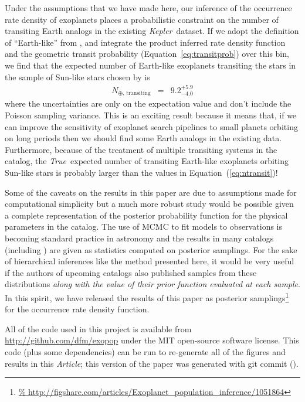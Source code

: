 \documentclass[12pt,preprint]{aastex}
\newcommand{\project}[1]{\emph{#1}}
\newcommand{\kepler}{\project{Kepler}}
\newcommand{\paper}{\textsl{Article}}
\newcommand{\foreign}[1]{\emph{#1}}
\newcommand{\True}{\foreign{True}}
\newcommand{\Eq}[1]{Equation~(\ref{eq:#1})}
\newcommand{\eq}[1]{\Eq{#1}}
\newcommand{\eqalt}[1]{Equation~\ref{eq:#1}}
\newcommand{\eqlabel}[1]{\label{eq:#1}}
\newcommand{\radius}{\ensuremath{R}}
\newcommand{\period}{\ensuremath{P}}
\begin{document}
Under the assumptions that we have made here, our inference of the occurrence
rate density of exoplanets places a probabilistic constraint on the number of
transiting Earth analogs in the existing \kepler\ dataset.
If we adopt the definition of ``Earth-like'' from \citet[][$200 \le
\period/\mathrm{day} < 400$ and $1 \le \radius/\radius_\oplus < 2$]{petigura},
and integrate the product inferred rate density function and the geometric
transit probability (\eqalt{transitprob}) over this bin, we find that the
expected number of Earth-like exoplanets transiting the stars in the sample of
Sun-like stars chosen by \citet{petigura} is
\begin{eqnarray}\eqlabel{ntransit}
N_{\oplus,\,\mathrm{transiting}} &=& 9.2_{-4.0}^{+5.9}
\end{eqnarray}
where the uncertainties are only on the expectation value and don't include
the Poisson sampling variance.
This is an exciting result because it means that, if we can improve the
sensitivity of exoplanet search pipelines to small planets orbiting on long
periods then we should find some Earth analogs in the existing data.
Furthermore, because of the treatment of multiple transiting systems in the
catalog, the \True\ expected number of transiting Earth-like exoplanets
orbiting Sun-like stars is probably larger than the values in \eq{ntransit}!

Some of the caveats on the results in this paper are due to assumptions made
for computational simplicity but a much more robust study would be possible
given a complete representation of the posterior probability function for the
physical parameters in the catalog.
The use of MCMC to fit models to observations is becoming standard practice in
astronomy and the results in many catalogs (including \citealt{petigura}) are
given as statistics computed on posterior samplings.
For the sake of hierarchical inferences like the method presented here, it
would be very useful if the authors of upcoming catalogs also published
samples from these distributions \emph{along with the value of their prior
function evaluated at each sample}.
In this spirit, we have released the results of this paper as posterior
samplings\footnote{\url{%
http://figshare.com/articles/Exoplanet_population_inference/1051864}} for the
occurrence rate density function.

All of the code used in this project is available from
\url{http://github.com/dfm/exopop} under the MIT open-source software license.
This code (plus some dependencies) can be run to re-generate all of the
figures and results in this \paper; this version of the paper was generated
with git commit \texttt{\githash} (\gitdate).
\end{document}
